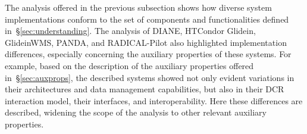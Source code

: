 \documentclass{sig-alternate}
\begin{document}



The analysis offered in the previous subsection shows how diverse \pilot system
implementations conform to the set of components and functionalities defined
in~\S\ref{sec:understanding}.  The analysis of DIANE, HTCondor Glidein,
GlideinWMS, PANDA, and RADICAL-Pilot also highlighted implementation
differences, especially concerning the auxiliary properties of these \pilot
systems. For example, based on the description of the auxiliary properties
offered in~\S\ref{sec:auxprops}, the described \pilot systems showed not only
evident variations in their architectures and data management capabilities, but
also in their DCR interaction model, their interfaces, and interoperability.
Here these differences are described, widening the scope of the analysis to
other relevant auxiliary properties.

\end{document}
